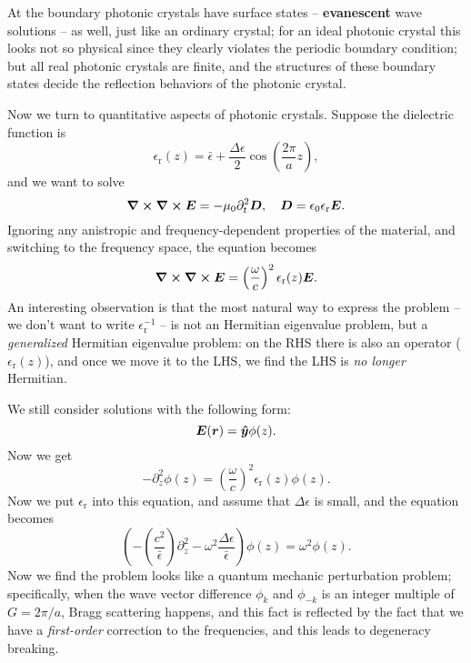\documentclass[hyperref, a4paper]{article}
\newcommand*{\concept}[1]{{\textbf{#1}}}
\newcommand{\epsr}{\epsilon_{\text{r}}}
\begin{document}
At the boundary photonic crystals have surface states -- 
\concept{evanescent} wave solutions -- as well, 
just like an ordinary crystal; 
for an ideal photonic crystal this looks not so physical 
since they clearly violates the periodic boundary condition; 
but all real photonic crystals are finite, 
and the structures of these boundary states 
decide the reflection behaviors of the photonic crystal.

Now we turn to quantitative aspects of photonic crystals.
Suppose the dielectric function is 
\begin{equation}
    \epsr(z) = \bar{\epsilon} + \frac{\Delta \epsilon}{2} \cos (\frac{2\pi}{a} z),
\end{equation}
and we want to solve 
\begin{equation}
    \curl{\curl{\vb*{E}}} = - \mu_0 \partial_t^2 \vb*{D}, \quad 
    \vb*{D} = \epsilon_0 \epsr \vb*{E}.
\end{equation}
Ignoring any anistropic and frequency-dependent properties of the material, 
and switching to the frequency space, 
the equation becomes 
\begin{equation}
    \curl{\curl{\vb*{E}}} = \left(\frac{\omega}{c}\right)^2 \epsr(z) \vb*{E}.
\end{equation}
An interesting observation is that the most natural way to express the problem 
-- we don't want to write $\epsr^{-1}$  -- 
is not an Hermitian eigenvalue problem, 
but a \emph{generalized} Hermitian eigenvalue problem:
on the RHS there is also an operator ($\epsr(z)$), 
and once we move it to the LHS, 
we find the LHS is \emph{no longer} Hermitian.

We still consider solutions with the following form:
\begin{equation}
    \vb*{E}(\vb*{r}) = \vu*{y} \phi(z) .
\end{equation}
Now we get 
\begin{equation}
    - \partial_z^2 \phi(z) = \left(\frac{\omega}{c}\right)^2 \epsr(z) \phi(z).
\end{equation}
Now we put $\epsr$ into this equation, and assume that $\Delta \epsilon$ is small,
and the equation becomes
\begin{equation}
    \left(- \left(\frac{c^2}{\bar{\epsilon}}\right) \partial_z^2 - \omega^2 \frac{\Delta \epsilon}{\bar{\epsilon}}\right) \phi(z) = \omega^2 \phi(z).
\end{equation}
Now we find the problem looks like a quantum mechanic perturbation problem;
specifically, when the wave vector difference  $\phi_{k}$ and $\phi_{-k}$ 
is an integer multiple of $G = 2\pi / a$, 
Bragg scattering happens, and this fact is reflected by the fact that 
we have a \emph{first-order} correction to the frequencies, 
and this leads to degeneracy breaking.
\end{document}
